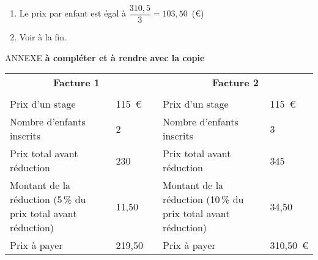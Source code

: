 
\medskip
 
%
 
\begin{enumerate}
\item %
Le prix par enfant est égal à $\dfrac{310,5}{3} = 103,50$~(\euro) 
\item %
Voir à la fin.
\end{enumerate}

\begin{center}
ANNEXE \textbf{à compléter et à rendre avec la copie}

\vspace{1cm}

\renewcommand\arraystretch{2}
\begin{tabularx}{\linewidth}{|X|m{1.75cm}|c|X|m{1.75cm}|} 
\multicolumn{2}{c}{\textbf{Facture 1}}&\multicolumn{1}{c}{\quad}&\multicolumn{2}{c}{\textbf{Facture 2}}\\
\multicolumn{2}{c}{\quad}&\multicolumn{1}{c}{\quad}&\multicolumn{2}{c}{\quad}\\  \cline{1-2}\cline{4-5} 
Prix d'un stage &115~\euro& &Prix d'un stage&115~\euro\\ \cline{1-2}\cline{4-5}  
Nombre d'enfants inscrits &2&\qquad&Nombre d'enfants inscrits &3\\   \cline{1-2}\cline{4-5}
Prix total avant réduction &230& &Prix total avant réduction&345\\  \cline{1-2}\cline{4-5} 
Montant de la réduction (5\,\% du prix total avant réduction) &11,50& &Montant de la réduction (10\,\% du prix total avant réduction)&34,50\\  \cline{1-2}\cline{4-5} 
Prix à payer &219,50& & Prix à payer &310,50~\euro\\ \cline{1-2}\cline{4-5}
\end{tabularx} 
\end{center}
\bigskip 

